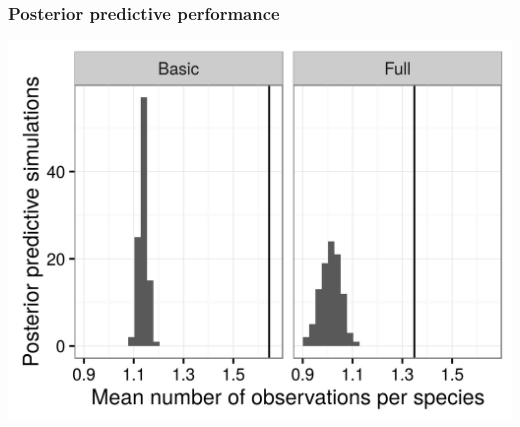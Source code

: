 \documentclass{beamer}
\begin{document}
\begin{frame}
  \frametitle{Posterior predictive performance}

  \begin{center}
    \includegraphics[height=\textheight,width=\textwidth,keepaspectratio=true]{figure/pred_occ}
  \end{center}
\end{frame}
\end{document}
